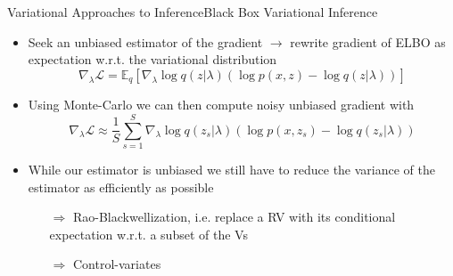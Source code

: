 \documentclass[AERbeamer%
              ,optEnglish%
              ,optBiber%
              ,optBibstyleAlphabetic%
              ,optBeamerClassicFormat%
              ]{AERlatex}%
\begin{document}
\begin{frame}[c]{Variational Approaches to Inference}{Black Box Variational Inference}
    \centering
    \begin{itemize}
        \item Seek an unbiased estimator of the gradient $\rightarrow$ rewrite gradient of ELBO
              as expectation w.r.t. the variational distribution
        \begin{equation*}
            \nabla_{\lambda} \mathcal{L} = \mathbb{E}_{q}\left[ \nabla_{\lambda} \log q(z | \lambda) (\log p(x, z) - \log q(z | \lambda)) \right]
        \end{equation*}
        \item Using Monte-Carlo we can then compute noisy unbiased gradient with
        \begin{equation*}
            \nabla_{\lambda} \mathcal{L} \approx \frac{1}{S} \sum_{s=1}^{S} \nabla_{\lambda} \log q(z_{s} | \lambda) (\log p(x, z_{s}) - \log q(z_{s} | \lambda))
        \end{equation*}
        \item While our estimator is unbiased we still have to reduce the variance of the estimator as efficiently as possible
        \begin{itemize}
            \item[\textbf{$\Rightarrow$}] Rao-Blackwellization, i.e. replace a RV with its conditional expectation w.r.t. a subset of the Vs
            \item[\textbf{$\Rightarrow$}] Control-variates
        \end{itemize}
    \end{itemize}
\end{frame}
\end{document}
